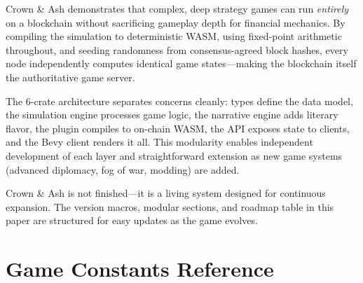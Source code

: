 \documentclass[a4paper, 11pt]{article}
\begin{document}
Crown \& Ash demonstrates that complex, deep strategy games can run
\emph{entirely} on a blockchain without sacrificing gameplay depth for
financial mechanics. By compiling the simulation to deterministic WASM,
using fixed-point arithmetic throughout, and seeding randomness from
consensus-agreed block hashes, every node independently computes identical
game states---making the blockchain itself the authoritative game server.

The 6-crate architecture separates concerns cleanly: types define the data
model, the simulation engine processes game logic, the narrative engine adds
literary flavor, the plugin compiles to on-chain WASM, the API exposes state
to clients, and the Bevy client renders it all. This modularity enables
independent development of each layer and straightforward extension as new
game systems (advanced diplomacy, fog of war, modding) are added.

Crown \& Ash is not finished---it is a living system designed for continuous
expansion. The version macros, modular sections, and roadmap table in this
paper are structured for easy updates as the game evolves.


\appendix

\section{Game Constants Reference}
\label{app:constants}
\end{document}
